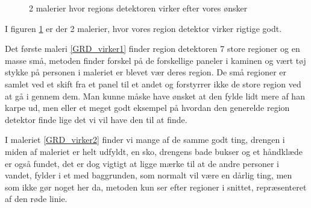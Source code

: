 \begin{figure}[!h]
{        	\label{GRD_virker1}}\hspace{1em}
		\hspace{1em}
        \caption[]{2 malerier hvor regions detektoren virker efter vores ønsker}
     \label{generelde_region_detektor_virker}
\end{figure}

I figuren \ref{generelde_region_detektor_virker} er der 2 malerier, hvor
vores region detektor virker rigtige godt. 

Det første maleri \ref{GRD_virker1} finder region detektoren 7 store
regioner og en masse små, metoden finder forskel på de forskellige
paneler i kaminen og vært tøj stykke på personen i maleriet er blevet
vær deres region. De små regioner er samlet ved et skift fra et panel
til et andet og forstyrrer ikke de store region ved at gå i gennem dem.
Man kunne måske have ønsket at den fylde lidt mere af han karpe ud, men
eller et meget godt eksempel på hvordan den generelde region detektor
finde lige det vi vil have den til at finde. 

I maleriet \ref{GRD_virker2} finder vi mange af de samme godt ting,
drengen i miden af maleriet er helt udfyldt, en sko, drengens bade
bukser og et håndklæde er også fundet, det er dog vigtigt at ligge mærke
til at de andre personer i vandet, fylder i et med baggrunden, som
normalt vil være en dårlig ting, men som ikke gør noget her da, metoden
kun ser efter regioner i snittet, repræsenteret af den røde linie.
 
